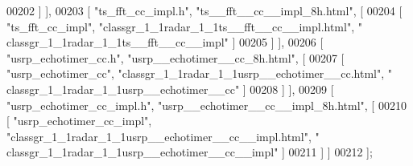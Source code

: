 \begin{DoxyCode}
00202     ] ],
00203     [ \textcolor{stringliteral}{"ts\_fft\_cc\_impl.h"}, \textcolor{stringliteral}{"ts\_\_fft\_\_cc\_\_impl\_8h.html"}, [
00204       [ \textcolor{stringliteral}{"ts\_fft\_cc\_impl"}, \textcolor{stringliteral}{"classgr\_1\_1radar\_1\_1ts\_\_fft\_\_cc\_\_impl.html"}, \textcolor{stringliteral}{"
      classgr\_1\_1radar\_1\_1ts\_\_fft\_\_cc\_\_impl"} ]
00205     ] ],
00206     [ \textcolor{stringliteral}{"usrp\_echotimer\_cc.h"}, \textcolor{stringliteral}{"usrp\_\_echotimer\_\_cc\_8h.html"}, [
00207       [ \textcolor{stringliteral}{"usrp\_echotimer\_cc"}, \textcolor{stringliteral}{"classgr\_1\_1radar\_1\_1usrp\_\_echotimer\_\_cc.html"}, \textcolor{stringliteral}{"
      classgr\_1\_1radar\_1\_1usrp\_\_echotimer\_\_cc"} ]
00208     ] ],
00209     [ \textcolor{stringliteral}{"usrp\_echotimer\_cc\_impl.h"}, \textcolor{stringliteral}{"usrp\_\_echotimer\_\_cc\_\_impl\_8h.html"}, [
00210       [ \textcolor{stringliteral}{"usrp\_echotimer\_cc\_impl"}, \textcolor{stringliteral}{"classgr\_1\_1radar\_1\_1usrp\_\_echotimer\_\_cc\_\_impl.html"}, \textcolor{stringliteral}{"
      classgr\_1\_1radar\_1\_1usrp\_\_echotimer\_\_cc\_\_impl"} ]
00211     ] ]
00212 ];
\end{DoxyCode}
